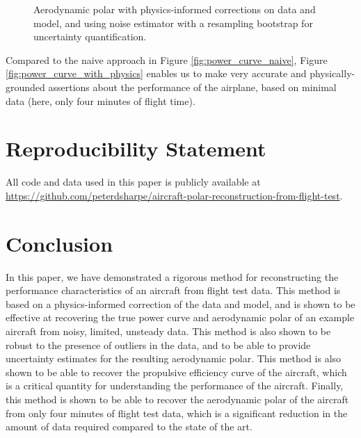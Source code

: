 \documentclass[conf]{new-aiaa}
\begin{document}
    \begin{figure}[!htb]
        \centering
        \caption{Aerodynamic polar with physics-informed corrections on data and model, and using noise estimator with a resampling bootstrap for uncertainty quantification.}
        \label{fig:aerodynamic_polar_with_physics}
    \end{figure}

    Compared to the naive approach in Figure \ref{fig:power_curve_naive}, Figure \ref{fig:power_curve_with_physics} enables us to make very accurate and physically-grounded assertions about the performance of the airplane, based on minimal data (here, only four minutes of flight time).


    \section{Reproducibility Statement}

    All code and data used in this paper is publicly available at \url{https://github.com/peterdsharpe/aircraft-polar-reconstruction-from-flight-test}.


    \section{Conclusion}

    In this paper, we have demonstrated a rigorous method for reconstructing the performance characteristics of an aircraft from flight test data. This method is based on a physics-informed correction of the data and model, and is shown to be effective at recovering the true power curve and aerodynamic polar of an example aircraft from noisy, limited, unsteady data. This method is also shown to be robust to the presence of outliers in the data, and to be able to provide uncertainty estimates for the resulting aerodynamic polar. This method is also shown to be able to recover the propulsive efficiency curve of the aircraft, which is a critical quantity for understanding the performance of the aircraft. Finally, this method is shown to be able to recover the aerodynamic polar of the aircraft from only four minutes of flight test data, which is a significant reduction in the amount of data required compared to the state of the art.
\end{document}
